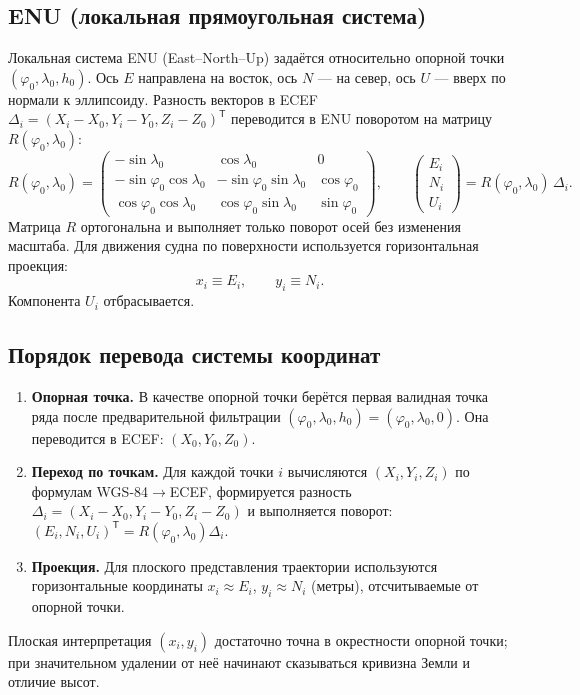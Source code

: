 \documentclass[a4paper,12pt]{report}
\begin{document}
	\subsection{ENU (локальная прямоугольная система)}
	Локальная система ENU (East--North--Up) задаётся относительно опорной точки $(\varphi_0,\lambda_0,h_0)$. Ось $E$ направлена на восток, ось $N$ --- на север, ось $U$ --- вверх по нормали к эллипсоиду. Разность векторов в ECEF $\Delta_i = (X_i-X_0, Y_i-Y_0, Z_i-Z_0)^{\mathsf T}$ переводится в ENU поворотом на матрицу $R(\varphi_0,\lambda_0)$:
	\begin{equation*}
		R(\varphi_0,\lambda_0)=
		\begin{pmatrix}
			-\sin\lambda_0 & \cos\lambda_0 & 0\\
			-\sin\varphi_0\cos\lambda_0 & -\sin\varphi_0\sin\lambda_0 & \cos\varphi_0\\
			\cos\varphi_0\cos\lambda_0 & \cos\varphi_0\sin\lambda_0 & \sin\varphi_0
		\end{pmatrix}, \qquad
		\begin{pmatrix}E_i\\N_i\\U_i\end{pmatrix}=R(\varphi_0,\lambda_0)\,\Delta_i.
	\end{equation*}
	Матрица $R$ ортогональна и выполняет только поворот осей без изменения масштаба. Для движения судна по поверхности используется горизонтальная проекция:
	\begin{equation*}
		x_i \equiv E_i, \qquad y_i \equiv N_i.
	\end{equation*}
	Компонента $U_i$ отбрасывается.

	\subsection{Порядок перевода системы координат}
	\begin{enumerate}
		\item \textbf{Опорная точка.} В качестве опорной точки берётся первая валидная точка ряда после предварительной фильтрации $(\varphi_0,\lambda_0,h_0)=(\varphi_0,\lambda_0,0)$. Она переводится в ECEF: $(X_0,Y_0,Z_0)$.
		\item \textbf{Переход по точкам.} Для каждой точки $i$ вычисляются $(X_i,Y_i,Z_i)$ по формулам WGS-84$\to$ECEF, формируется разность $\Delta_i=(X_i-X_0,Y_i-Y_0,Z_i-Z_0)$ и выполняется поворот: $(E_i,N_i,U_i)^{\mathsf T}=R(\varphi_0,\lambda_0)\Delta_i$.
		\item \textbf{Проекция.} Для плоского представления траектории используются горизонтальные координаты $x_i \approx E_i$, $y_i \approx N_i$ (метры), отсчитываемые от опорной точки.
	\end{enumerate}
	Плоская интерпретация $(x_i,y_i)$ достаточно точна в окрестности опорной точки; при значительном удалении от неё начинают сказываться кривизна Земли и отличие высот.
\end{document}
